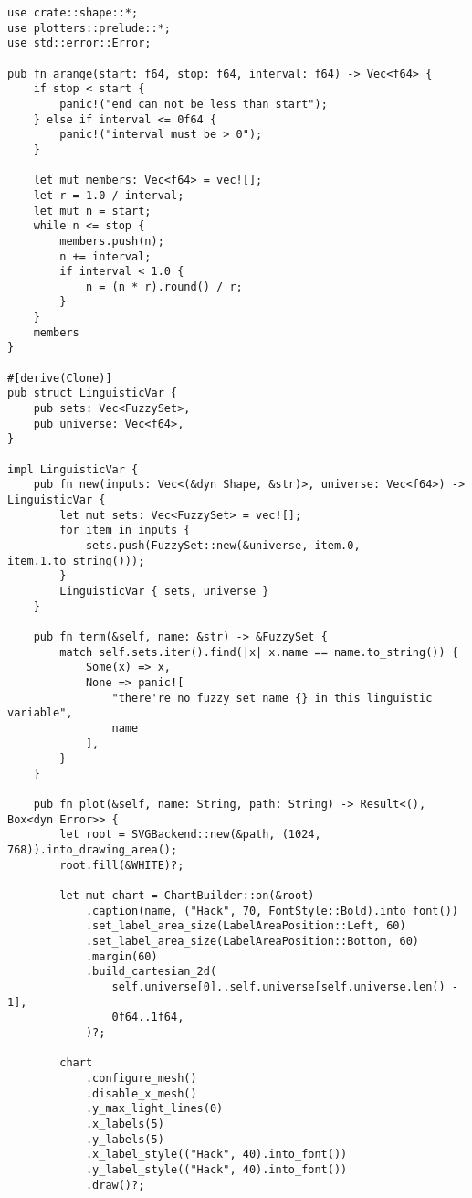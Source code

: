 \begin{verbatim}
use crate::shape::*;
use plotters::prelude::*;
use std::error::Error;

pub fn arange(start: f64, stop: f64, interval: f64) -> Vec<f64> {
    if stop < start {
        panic!("end can not be less than start");
    } else if interval <= 0f64 {
        panic!("interval must be > 0");
    }

    let mut members: Vec<f64> = vec![];
    let r = 1.0 / interval;
    let mut n = start;
    while n <= stop {
        members.push(n);
        n += interval;
        if interval < 1.0 {
            n = (n * r).round() / r;
        }
    }
    members
}

#[derive(Clone)]
pub struct LinguisticVar {
    pub sets: Vec<FuzzySet>,
    pub universe: Vec<f64>,
}

impl LinguisticVar {
    pub fn new(inputs: Vec<(&dyn Shape, &str)>, universe: Vec<f64>) -> LinguisticVar {
        let mut sets: Vec<FuzzySet> = vec![];
        for item in inputs {
            sets.push(FuzzySet::new(&universe, item.0, item.1.to_string()));
        }
        LinguisticVar { sets, universe }
    }

    pub fn term(&self, name: &str) -> &FuzzySet {
        match self.sets.iter().find(|x| x.name == name.to_string()) {
            Some(x) => x,
            None => panic![
                "there're no fuzzy set name {} in this linguistic variable",
                name
            ],
        }
    }

    pub fn plot(&self, name: String, path: String) -> Result<(), Box<dyn Error>> {
        let root = SVGBackend::new(&path, (1024, 768)).into_drawing_area();
        root.fill(&WHITE)?;

        let mut chart = ChartBuilder::on(&root)
            .caption(name, ("Hack", 70, FontStyle::Bold).into_font())
            .set_label_area_size(LabelAreaPosition::Left, 60)
            .set_label_area_size(LabelAreaPosition::Bottom, 60)
            .margin(60)
            .build_cartesian_2d(
                self.universe[0]..self.universe[self.universe.len() - 1],
                0f64..1f64,
            )?;

        chart
            .configure_mesh()
            .disable_x_mesh()
            .y_max_light_lines(0)
            .x_labels(5)
            .y_labels(5)
            .x_label_style(("Hack", 40).into_font())
            .y_label_style(("Hack", 40).into_font())
            .draw()?;


\end{verbatim}
